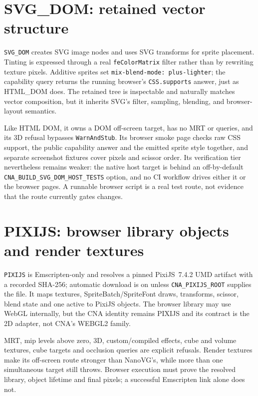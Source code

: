 \section{SVG\_DOM: retained vector structure}

\texttt{SVG\_DOM} creates SVG image nodes and uses SVG transforms for sprite placement.
Tinting is expressed through a real \texttt{feColorMatrix} filter rather than by rewriting
texture pixels. Additive sprites set \texttt{mix-blend-mode: plus-lighter}; the capability query
returns the running browser's \texttt{CSS.supports} answer, just as HTML\_DOM does. The retained
tree is inspectable and naturally matches vector composition, but it inherits SVG's filter,
sampling, blending, and browser-layout semantics.

Like HTML DOM, it owns a DOM off-screen target, has no MRT or queries, and its 3D refusal
bypasses \texttt{WarnAndStub}. Its browser smoke page checks raw CSS support, the public
capability answer and the emitted sprite style together, and separate screenshot fixtures cover
pixels and scissor order. Its verification tier nevertheless remains weaker: the native host
target is behind an off-by-default \texttt{CNA\_BUILD\_SVG\_DOM\_HOST\_TESTS} option, and no CI
workflow drives either it or the browser pages. A runnable browser script is a real test route,
not evidence that the route currently gates changes.

\section{PIXIJS: browser library objects and render textures}

\texttt{PIXIJS} is Emscripten-only and resolves a pinned PixiJS~7.4.2 UMD artifact with a recorded
SHA-256; automatic download is on unless \texttt{CNA\_PIXIJS\_ROOT} supplies the file. It maps
textures, SpriteBatch/SpriteFont draws, transforms, scissor, blend state and one active
 to PixiJS objects. The browser library may use WebGL internally, but the
CNA identity remains PIXIJS and its contract is the 2D adapter, not CNA's WEBGL2 family.

MRT, mip levels above zero, 3D, custom/compiled effects, cube and volume textures, cube targets
and occlusion queries are explicit refusals. Render textures make its off-screen route stronger
than NanoVG's, while more than one simultaneous target still throws. Browser execution must prove
the resolved library, object lifetime and final pixels; a successful Emscripten link alone does
not.

